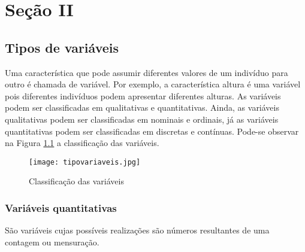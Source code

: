 \documentclass[11pt,fleqn]{book} %
\begin{document}

\part{Seção II}




\chapter{Tipos de variáveis}


Uma característica que pode assumir diferentes valores de um indivíduo para outro é chamada de variável. Por exemplo, a característica altura é uma variável pois diferentes indivíduos podem apresentar diferentes alturas.
As variáveis podem ser classificadas em qualitativas e quantitativas. Ainda, as variáveis qualitativas podem ser classificadas em nominais e ordinais, já as variáveis quantitativas podem ser classificadas em discretas e contínuas. Pode-se observar na Figura \ref{fig:tipovariaveis} a classificação das variáveis.

\begin{figure}[h]
	\centering\texttt{[image: tipovariaveis.jpg]}
	\caption{Classificação das variáveis}
	\label{fig:tipovariaveis}
\end{figure}



\section{Variáveis quantitativas}
São variáveis cujas possíveis realizações são números resultantes de uma contagem ou mensuração.\\
\end{document}
